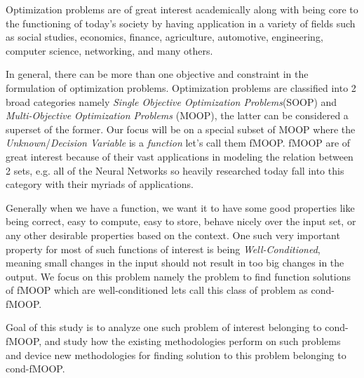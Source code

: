 
\hspace{1cm}Optimization problems are of great interest academically along with being core to the functioning of today's society by having application in a variety of fields such as social studies, economics, finance, agriculture, automotive, engineering, computer science, networking, and many others.

In general, there can be more than one objective and constraint in the formulation of optimization problems. Optimization problems are classified into 2 broad categories namely \textit{Single Objective Optimization Problems}(SOOP) and \textit{Multi-Objective Optimization Problems} (MOOP), the latter can be considered a superset of the former. Our focus will be on a special subset of MOOP where the \textit{Unknown}/\textit{Decision Variable} is a \textit{function} let's call them fMOOP. fMOOP are of great interest because of their vast applications in modeling the relation between 2 sets, e.g. all of the Neural Networks so heavily researched today fall into this category with their myriads of applications.

Generally when we have a function, we want it to have some good properties like being correct, easy to compute, easy to store, behave nicely over the input set, or any other desirable properties based on the context. One such very important property for most of such functions of interest is being \textit{Well-Conditioned}, meaning small changes in the input should not result in too big changes in the output. We focus on this problem namely the problem to find function solutions of fMOOP which are well-conditioned lets call this class of problem as cond-fMOOP.

Goal of this study is to analyze one such problem of interest belonging to cond-fMOOP, and study how the existing methodologies perform on such problems and device new methodologies for finding solution to this problem belonging to cond-fMOOP.

